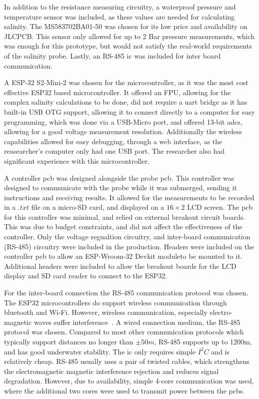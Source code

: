 In addition to the resistance measuring circuitry, a waterproof pressure and temperature sensor was included, as these values are needed for calculating salinity.
The MS583702BA01-50 was chosen for its low price and availability on JLCPCB.
This sensor only allowed for up to 2 Bar pressure measurements, which was enough for this prototype, but would not satisfy the real-world requirements of the salinity probe.
Lastly, an RS-485 \gls{ic} was included for inter board communication.

A ESP-32 S2-Mini-2 was chosen for the microcontroller, as it was the most cost effective ESP32 based microcontroller.
It offered an FPU, allowing for the complex salinity calculations to be done, did not require a \gls{uart} bridge as it has built-in USB OTG support, allowing it to connect directly to a computer for easy programming, which was done via a USB-Micro port, and offered 13-bit \gls{adc}s, allowing for a good voltage measurement resolution.
Additionally the wireless capabilities allowed for easy debugging, through a web interface, as the reasearcher's computer only had one USB port.
The researcher also had significant experience with this microcontroller.

A controller \gls{pcb} was designed alongside the probe \gls{pcb}.
This controller was designed to communicate with the probe while it was submerged, sending it instructions and receiving results.
It allowed for the measurements to be recorded in a $.txt$ file on a micro-SD card, and displayed on a $16\times2$ LCD screen.
The \gls{pcb} for this controller was minimal, and relied on external breakout circuit boards.
This was due to budget constraints, and did not affect the effectiveness of the controller.
Only the voltage regualtion circuitry, and inter-board communication (RS-485) circuitry were included in the production.
Headers were included on the controller \gls{pcb} to allow an ESP-Wroom-32 Devkit moduleto be mounted to it.
Additional headers were included to allow the breakout boards for the LCD display and SD card reader to connect to the ESP32. 

For the inter-board connection the RS-485 communication protocol was chosen.
The ESP32 microcontrollers do support wireless communication through bluetooth and Wi-Fi.
However, wireless communication, especially electro-magnetic waves suffer interference~\cite{waves_in_water}.
A wired connection medium, the RS-485 protocol was chosen. 
Compared to most other communication protocols which typically support distances no longer than $\pm50m$, RS-485 supports up to 1200m, and has good underwater stability.
The \gls{ic} only requires simple $I^2C$ and is relatively cheap.
RS-485 usually uses a pair of twisted cables, which strengthens the electromagnetic magnetic interference rejection and reduces signal degradation.
However, due to availability, simple 4-core communication was used, where the additional two cores were used to transmit power between the \gls{pcb}s.

